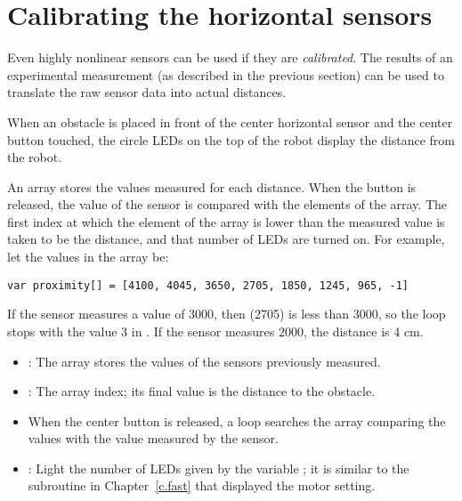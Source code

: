 \section{Calibrating the horizontal sensors}

Even highly nonlinear sensors can be used if they are \emph{calibrated}.
The results of an experimental measurement (as described in the previous
section) can be used to translate the raw sensor data into actual
distances.


When an obstacle is placed in front of the center horizontal sensor and
the center button touched, the circle LEDs on the top of the robot
display the distance from the robot.


An array stores the values measured for each distance. When the button
is released, the value of the sensor is compared with the elements of
the array. The first index at which the element of the array is lower
than the measured value is taken to be the distance, and that number of
LEDs are turned on. For example, let the values in the array be:

\begin{verbatim}
var proximity[] = [4100, 4045, 3650, 2705, 1850, 1245, 965, -1]
\end{verbatim} 

If the sensor measures a value of 3000, then  (2705) is
less than 3000, so the loop stops with the value 3 in .
If the sensor measures 2000, the distance is 4 cm.


\begin{itemize}

\item {}: The array stores the values of the sensors
previously measured.

\item {}: The array index; its final value is the distance to
the obstacle.

\end{itemize}


\begin{itemize}

\item When the center button is released, a loop searches the array
 comparing the values with the value measured by the
sensor.

\item {}: Light the number of LEDs given by the
variable ; it is similar to the subroutine in
Chapter~\ref{c.fast} that displayed the motor setting.

\end{itemize}

